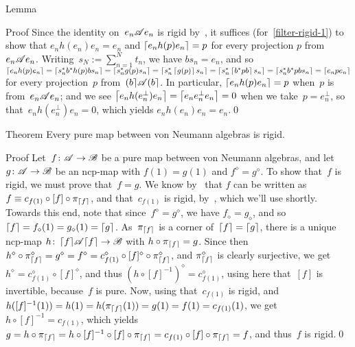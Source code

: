 \documentclass[a]{subfiles}
\begin{document}
\begin{parsec}
\begin{point}{Lemma}
\begin{point}{Proof}
Since the identity on~$e_n \mathscr{A} e_n$ is rigid
by~,
it suffices (for~\eqref{filter-rigid-1})
to show that 
$e_n h(e_n) e_n = e_n$
and 
$\left\lceil e_nh(p)e_n\right\rceil = p$
for every projection $p$ from $e_n\mathscr{A} e_n$.
Writing~$s_N:=\sum_{n=1}^N t_n$,
we have $bs_n = e_n$,
and so
$
\left\lceil e_n h(p) e_n\right\rceil
=
\left\lceil s_n^* b^* h(p) b s_n\right\rceil
=
\left\lceil s_n^*g(p) s_n\right\rceil
=
\left\lceil s_n^* \left\lceil g(p)\right\rceil s_n\right\rceil
=
\left\lceil s_n^* \left\lceil b^* p b\right\rceil s_n\right\rceil
=
\left\lceil s_n^* b^* p b s_n\right\rceil
=
\left\lceil e_n p e_n \right\rceil
$
for every 
projection~$p$ from~$\left(b\right\rceil\!\mathscr{A}\!\left(b\right\rceil$.
In particular, $\left\lceil e_n h(p)e_n\right\rceil = p$
when~$p$ is from~$e_n \mathscr{A} e_n$;
and we see $\left\lceil e_n h(e_n^\perp) e_n\right\rceil=\left\lceil e_n e_n^\perp e_n\right\rceil=0$
when we take~$p=e_n^\perp$,
so that~$e_n h(e_n^\perp) e_n =0$,
which yields $e_nh(e_n)e_n = e_n$.\qed
\end{point}
\end{point}
\begin{point}{Theorem}%
Every pure map between von Neumann algebras is rigid.
\begin{point}{Proof}%
Let~$f\colon \mathscr{A}\to\mathscr{B}$ be a pure map between von Neumann algebras,
and let~$g\colon \mathscr{A}\to\mathscr{B}$ be an ncp-map
with $f(1)=g(1)$
and $f^\diamond = g^\diamond$.
To show that~$f$
is rigid,
we must prove that~$f=g$.
We know by~
that $f$ can be written as $f\equiv c_{f(1)} \circ [f]\circ \pi_{\left\lceil f\right\rceil}$,
and that~$c_{f(1)}$ is rigid,
by~,
which we'll use shortly.
Towards this end,
note that since~$f^\diamond = g^\diamond$,
we have $f_\diamond = g_\diamond$,
and so $\left\lceil f\right\rceil=f_\diamond(1)=g_\diamond(1)=\left\lceil g\right\rceil$.
As~$\pi_{\left\lceil f\right\rceil}$ is a corner of~$\left\lceil f\right\rceil=\left\lceil g\right\rceil$,
there is a unique ncp-map $h\colon \left\lceil f\right\rceil\!\mathscr{A}\!\left\lceil f\right\rceil\to\mathscr{B}$
with $h\circ \pi_{\left\lceil f\right\rceil} =g$. 
Since then
$h^\diamond \circ \pi_{\left\lceil f\right\rceil}^\diamond
= g^\diamond = f^\diamond 
= c_{f(1)}^\diamond
\circ [f]^\diamond \circ \pi_{\left\lceil f\right\rceil}^\diamond$,
 and $\pi_{\left\lceil f\right\rceil}^\diamond$ is clearly surjective,
we get~$h^\diamond = c_{f(1)}^\diamond\circ [f]^\diamond$,
and thus  $(h\circ [f]^{-1})^\diamond = c_{f(1)}^\diamond$,
using here that~$[f]$ is invertible,
because~$f$ is pure.
Now,
using that~$c_{f(1)}$
is rigid,
and $h([f]^{-1}(1))=h(1)=h(\pi_{\left\lceil f\right\rceil}(1))=g(1)=f(1)=c_{f(1)}(1)$,
we get~$h\circ [f]^{-1}=c_{f(1)}$,
which yields
$g=h\circ \pi_{\left\lceil f\right\rceil} 
=h\circ [f]^{-1}\circ [f]\circ \pi_{\left\lceil f\right\rceil}
= c_{f(1)} \circ [f] \circ \pi_{\left\lceil f\right\rceil} = f$,
and thus~$f$ is rigid.\qed
\end{point}
\end{point}
\end{parsec}
\end{document}

